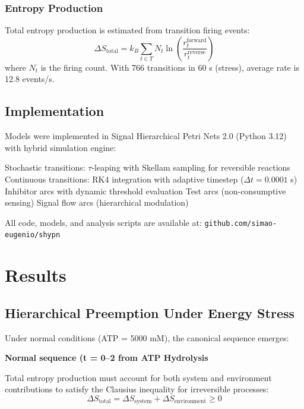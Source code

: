 \documentclass[twocolumn,11pt]{article}
\begin{document}
\subsubsection{Entropy Production}

Total entropy production is estimated from transition firing events:
\begin{equation}
    \Delta S_{\text{total}} = k_B \sum_{t \in T} N_t \ln\left(\frac{r_t^{\text{forward}}}{r_t^{\text{reverse}}}\right)
\end{equation}
where $N_t$ is the firing count. With 766 transitions in 60 s (stress), average rate is 12.8 events/s.

\subsection{Implementation}

Models were implemented in Signal Hierarchical Petri Nets 2.0 (Python 3.12) with hybrid simulation engine:

Stochastic transitions: $\tau$-leaping with Skellam sampling for reversible reactions
Continuous transitions: RK4 integration with adaptive timestep ($\Delta t = 0.0001$ s)
Inhibitor arcs with dynamic threshold evaluation
Test arcs (non-consumptive sensing)
Signal flow arcs (hierarchical modulation)


All code, models, and analysis scripts are available at: \texttt{github.com/simao-eugenio/shypn}

\section{Results}

\subsection{Hierarchical Preemption Under Energy Stress}

Under normal conditions (ATP = 5000 mM), the canonical sequence emerges:

\textbf{Normal sequence (t = 0--2 from ATP Hydrolysis}

Total entropy production must account for both system and environment contributions to satisfy the Clausius inequality for irreversible processes:
\begin{equation}
    \Delta S_{\text{total}} = \Delta S_{\text{system}} + \Delta S_{\text{environment}} \geq 0
\end{equation}
\end{document}
